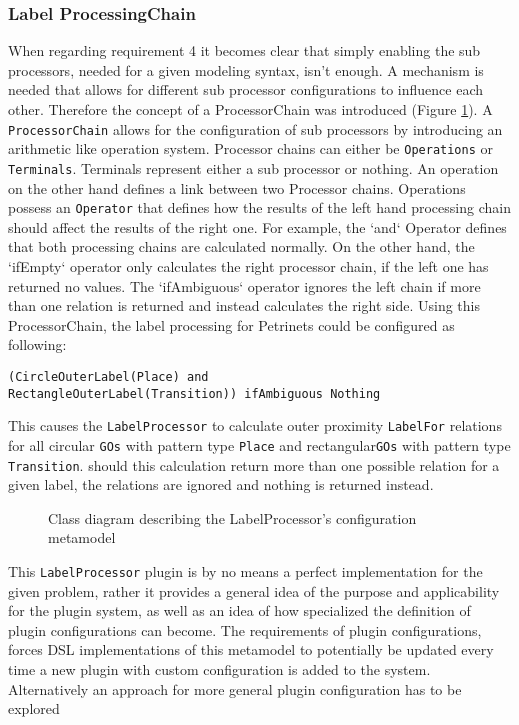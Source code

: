 \subsubsection{Label ProcessingChain}
When regarding requirement 4 it becomes clear that simply enabling the sub processors, needed for a given modeling syntax, isn't enough. A mechanism is needed that allows for different sub processor configurations to influence each other. Therefore the concept of a ProcessorChain was introduced (Figure \ref{fig:labelprocessor-config}). A \texttt{ProcessorChain} allows for the configuration of sub processors by introducing an arithmetic like operation system. Processor chains can either be \texttt{Operations} or \texttt{Terminals}. Terminals represent either a sub processor or nothing. An operation on the other hand defines a link between two Processor chains. Operations possess an \texttt{Operator} that defines how the results of the left hand processing chain should affect the results of the right one. For example, the `and` Operator defines that both processing chains are calculated normally. On the other hand, the `ifEmpty` operator only calculates the right processor chain, if the left one has returned no values. The `ifAmbiguous` operator ignores the left chain if more than one relation is returned and instead calculates the right side. Using this ProcessorChain, the label processing for Petrinets could be configured as following:
\begin{lstlisting}
(CircleOuterLabel(Place) and 
RectangleOuterLabel(Transition)) ifAmbiguous Nothing
\end{lstlisting}
This causes the \texttt{LabelProcessor} to calculate outer proximity \texttt{LabelFor} relations for all circular \texttt{GOs} with pattern type \texttt{Place} and rectangular\texttt{GOs} with pattern type \texttt{Transition}. should this calculation return more than one possible relation for a given label, the relations are ignored and nothing is returned instead.

\begin{figure}[ht]
  \centering
  
  \caption{Class diagram describing the LabelProcessor's configuration metamodel}
  \label{fig:labelprocessor-config}
\end{figure}

This \texttt{LabelProcessor} plugin is by no means a perfect implementation for the given problem, rather it provides a general idea of the purpose and applicability for the plugin system, as well as an idea of how specialized the definition of plugin configurations can become. The requirements of plugin configurations, forces DSL implementations of this metamodel to potentially be updated every time a new plugin with custom configuration is added to the system. Alternatively an approach for more general plugin configuration has to be explored


